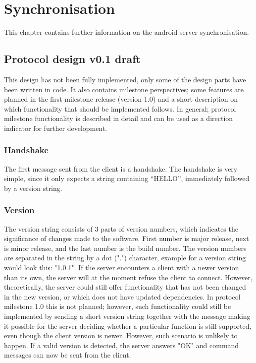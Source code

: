 \chapter{Synchronisation}
\label{android}
This chapter contains further information on the android-server synchronisation. 

\section{Protocol design v0.1 draft}
\label{protocolDesgin}
This design has not been fully implemented, only some of the design parts have been written in code. It also contains milestone perspectives; some features are planned in the first milestone release (version 1.0) and a short description on which functionality that should be implemented follows. In general; protocol milestone functionality is described in detail and can be used as a direction indicator for further development.  

\subsection{Handshake}
The first message sent from the client is a handshake. The handshake is very simple, since it only expects a string containing ``HELLO'', immediately followed by a version string.

\subsection{Version} 
The version string consists of 3 parts of version numbers, which indicates the significance of changes made to the software. First number is major release, next is minor release, and the last number is the build number. The version numbers are separated in the string by a dot (".") character, example for a version string would look this: "1.0.1". If the server encounters a client with a newer version than its own, the server will at the moment refuse the client to connect. However, theoretically, the server could still offer functionality that has not been changed in the new version, or which does not have updated dependencies. In protocol milestone 1.0 this is not planned; however, such functionality could still be implemented by sending a short version string together with the message making it possible for the server deciding whether a particular function is still supported, even though the client version is newer. However, such scenario is unlikely to happen. 
If a valid version is detected, the server answers "OK" and command messages can now be sent from the client.

